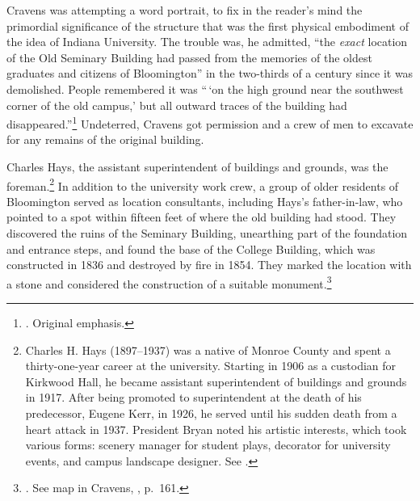 \documentclass[
  american,
  letterpaper,
]{scrreprt}
\begin{document}
Cravens was attempting a word portrait, to fix in the reader's mind the
primordial significance of the structure that was the first physical
embodiment of the idea of Indiana University. The trouble was, he
admitted, ``the \emph{exact} location of the Old Seminary Building had
passed from the memories of the oldest graduates and citizens of
Bloomington'' in the two-thirds of a century since it was demolished.
People remembered it was ``\,`on the high ground near the southwest
corner of the old campus,' but all outward traces of the building had
disappeared.''\footnote{.
  Original emphasis.} Undeterred, Cravens got permission and a crew of
men to excavate for any remains of the original building.

Charles Hays, the assistant superintendent of buildings and grounds, was
the foreman.\footnote{Charles H. Hays (1897--1937) was a native of
  Monroe County and spent a thirty-one-year career at the university.
  Starting in 1906 as a custodian for Kirkwood Hall, he became assistant
  superintendent of buildings and grounds in 1917. After being promoted
  to superintendent at the death of his predecessor, Eugene Kerr, in
  1926, he served until his sudden death from a heart attack in 1937.
  President Bryan noted his artistic interests, which took various
  forms: scenery manager for student plays, decorator for university
  events, and campus landscape designer. See
  .} In addition to the
university work crew, a group of older residents of Bloomington served
as location consultants, including Hays's father-in-law, who pointed to
a spot within fifteen feet of where the old building had stood. They
discovered the ruins of the Seminary Building, unearthing part of the
foundation and entrance steps, and found the base of the College
Building, which was constructed in 1836 and destroyed by fire in 1854.
They marked the location with a stone and considered the construction of
a suitable monument.\footnote{. See map in Cravens, , p.~161.}
\end{document}
